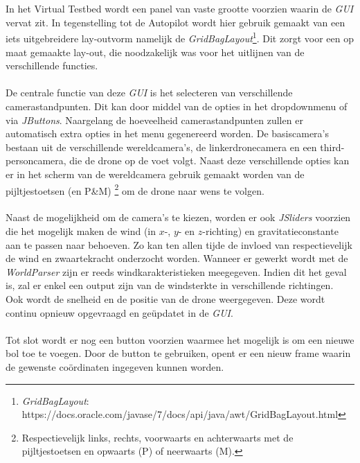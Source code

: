 \\
\\
In het Virtual Testbed wordt een panel van vaste grootte voorzien waarin de \textit{GUI} vervat zit. In tegenstelling tot de Autopilot wordt hier gebruik gemaakt van een iets uitgebreidere lay-outvorm namelijk de \textit{GridBagLayout}\footnote{\textit{GridBagLayout}: https://docs.oracle.com/javase/7/docs/api/java/awt/GridBagLayout.html}. Dit zorgt voor een op maat gemaakte lay-out, die noodzakelijk was voor het uitlijnen van de verschillende functies. 
\\
\\
De centrale functie van deze \textit{GUI} is het selecteren van verschillende camerastandpunten. Dit kan door middel van de opties in het dropdownmenu of via \textit{JButtons}. Naargelang de hoeveelheid camerastandpunten zullen er automatisch extra opties in het menu gegenereerd worden. De basiscamera's bestaan uit de verschillende wereldcamera's, de linkerdronecamera en een third-personcamera, die de drone op de voet volgt. Naast deze verschillende opties kan er in het scherm van de wereldcamera gebruik gemaakt worden van de pijltjestoetsen (en P\&M) \footnote{Respectievelijk links, rechts, voorwaarts en achterwaarts met de pijltjestoetsen en opwaarts (P) of neerwaarts (M).} om de drone naar wens te volgen. 
\\
\\
Naast de mogelijkheid om de camera's te kiezen, worden er ook \textit{JSliders} voorzien die het mogelijk maken de wind (in \(x\)-, \(y\)- en \(z\)-richting) en gravitatieconstante aan te passen naar behoeven. Zo kan ten allen tijde de invloed van respectievelijk de wind en zwaartekracht onderzocht worden. Wanneer er gewerkt wordt met de \textit{WorldParser} zijn er reeds windkarakteristieken meegegeven. Indien dit het geval is, zal er enkel een output zijn van de windsterkte in verschillende richtingen.
\\
Ook wordt de snelheid en de positie van de drone weergegeven. Deze wordt continu opnieuw opgevraagd en ge\"{u}pdatet in de \textit{GUI}. 
\\
\\
Tot slot wordt er nog een button voorzien waarmee het mogelijk is om een nieuwe bol toe te voegen. Door de button te gebruiken, opent er een nieuw frame waarin de gewenste co\"ordinaten ingegeven kunnen worden. 